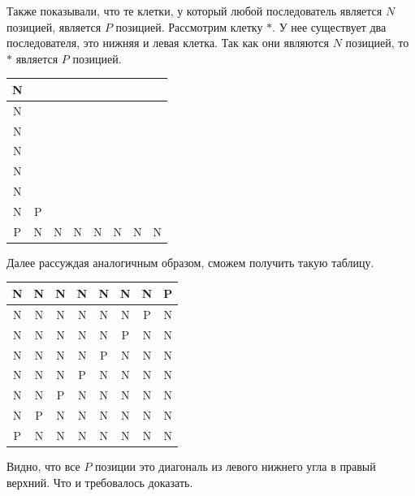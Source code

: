 \documentclass{article}
\begin{document}
Также показывали, что те клетки, у который любой последователь является $N$ позицией, является $P$ позицией. Рассмотрим клетку $*$. У нее существует два последователя, это нижняя и левая клетка. Так как они являются $N$ позицией, то $*$ является $P$ позицией.

\begin{table}[!ht]
    \centering
    \begin{tabular}{|c|c|c|c|c|c|c|c|}
    \hline
        N & ~ & ~ & ~ & ~ & ~ & ~ & ~ \\ \hline
        N & ~ & ~ & ~ & ~ & ~ & ~ & ~ \\ \hline
        N & ~ & ~ & ~ & ~ & ~ & ~ & ~ \\ \hline
        N & ~ & ~ & ~ & ~ & ~ & ~ & ~ \\ \hline
        N & ~ & ~ & ~ & ~ & ~ & ~ & ~ \\ \hline
        N & ~ & ~ & ~ & ~ & ~ & ~ & ~ \\ \hline
        N & P & ~ & ~ & ~ & ~ & ~ & ~ \\ \hline
        P & N & N & N & N & N & N & N \\ \hline
    \end{tabular}
\end{table}

\newpage

Далее рассуждая аналогичным образом, сможем получить такую таблицу.

\begin{table}[!ht]
    \centering
    \begin{tabular}{|c|c|c|c|c|c|c|c|}
    \hline
        N & N & N & N & N & N & N & P \\ \hline
        N & N & N & N & N & N & P & N \\ \hline
        N & N & N & N & N & P & N & N \\ \hline
        N & N & N & N & P & N & N & N \\ \hline
        N & N & N & P & N & N & N & N \\ \hline
        N & N & P & N & N & N & N & N \\ \hline
        N & P & N & N & N & N & N & N \\ \hline
        P & N & N & N & N & N & N & N \\ \hline
    \end{tabular}
\end{table}

Видно, что все $P$ позиции это диагональ из левого нижнего угла в правый верхний. Что и требовалось доказать. 
\end{document}
